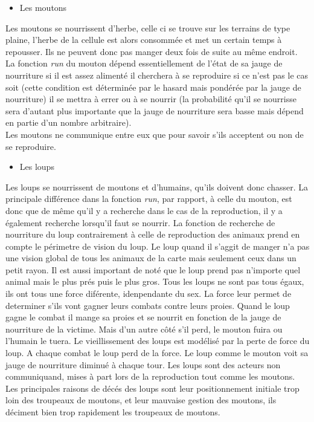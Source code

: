 \documentclass[12pt]{article}
\begin{document}
		\begin{itemize}
		\item Les moutons\\
		\end{itemize}

Les moutons se nourrissent d'herbe, celle ci se trouve sur les terrains de type
plaine, l'herbe de la cellule est alors consommée et met un certain temps à
repousser. Ils ne peuvent donc pas manger deux fois de suite au même endroit.\\

La fonction \textit{run} du mouton dépend essentiellement de l'état de sa
jauge de nourriture si il est assez alimenté il cherchera à se reproduire
si ce n'est pas le cas soit (cette condition est déterminée par le hasard mais
pondérée par la jauge de nourriture) il se mettra à errer ou à se nourrir (la
probabilité qu'il se nourrisse sera d'autant plus importante que la jauge de
nourriture sera basse mais dépend en partie d'un nombre arbitraire).\\

Les moutons ne communique entre eux que pour savoir s'ils acceptent ou non de 
se reproduire.\\

		\begin{itemize}
		\item Les loups\\
		\end{itemize}

Les loups se nourrissent de moutons et d'humains, qu'ils doivent donc chasser. La 
principale différence dans la fonction \textit{run}, par rapport, à celle du 
mouton, est donc que de même qu'il y a recherche dans le cas de la 
reproduction, il y a également recherche lorsqu'il faut se nourrir.
La fonction de recherche de nourriture du loup contrairement à celle de reproduction 
des animaux prend en compte le périmetre de vision du loup. Le loup quand il s'aggit de manger
n'a pas une vision global de tous les animaux de la carte mais seulement ceux dans un petit rayon.
Il est aussi important de noté que le loup prend pas n'importe quel animal mais le plus prés puis le plus 
gros. Tous les loups ne sont pas tous égaux, ils ont tous une force diférente, idenpendante du sex.
La force leur permet de determiner s'ils vont gagner leurs combats contre leurs proies.
Quand le loup gagne le combat il mange sa proies et se nourrit en fonction de la jauge de nourriture de la victime.
Mais d'un autre côté s'il perd, le mouton fuira ou l'humain le tuera.
Le vieillissement des loups est modélisé par la perte de force du loup. A chaque combat le loup perd de la force.
Le loup comme le mouton voit sa jauge de nourriture diminué à chaque tour.
Les loups sont des acteurs non communiquand, mises à part lors de la reproduction tout comme les moutons.
Les principales raisons de décés des loups sont leur positionnement initiale trop loin des troupeaux de moutons,
et leur mauvaise gestion des moutons, ils déciment bien trop rapidement les troupeaux de moutons.
\end{document}
